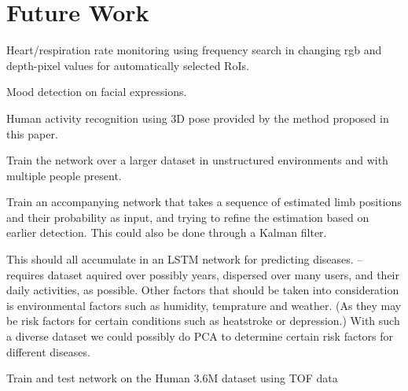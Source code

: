 \chapter{Future Work}


Heart/respiration rate monitoring using frequency search in changing rgb and depth-pixel values for automatically selected RoIs.

Mood detection on facial expressions.

Human activity recognition using 3D pose provided by the method proposed in this paper.

Train the network over a larger dataset in unstructured environments and with multiple people present.

Train an accompanying network that takes a sequence of estimated limb positions and their probability as input, and trying to refine the estimation based on earlier detection. This could also be done through a Kalman filter.

This should all accumulate in an LSTM network for predicting diseases. -- requires dataset aquired over possibly years, dispersed over many users, and their daily activities, as possible. Other factors that should be taken into consideration is environmental factors such as humidity, temprature and weather. (As they may be risk factors for certain conditions such as heatstroke or depression.) With such a diverse dataset we could possibly do PCA to determine certain risk factors for different diseases.

Train and test network on the Human 3.6M dataset using TOF data
